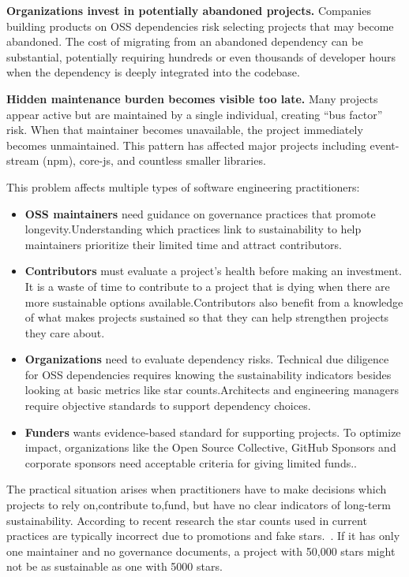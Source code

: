 \documentclass[conference]{IEEEtran}
\begin{document}
\textbf{Organizations invest in potentially abandoned projects.} Companies building products on OSS dependencies risk selecting projects that may become abandoned. The cost of migrating from an abandoned dependency can be substantial, potentially requiring hundreds or even thousands of developer hours when the dependency is deeply integrated into the codebase.

\textbf{Hidden maintenance burden becomes visible too late.} Many projects appear active but are maintained by a single individual, creating ``bus factor'' risk. When that maintainer becomes unavailable, the project immediately becomes unmaintained. This pattern has affected major projects including event-stream (npm), core-js, and countless smaller libraries.

This problem affects multiple types of software engineering practitioners:
\begin{itemize}
    \item \textbf{OSS maintainers} need guidance on governance practices that promote longevity.Understanding which practices link to sustainability to help maintainers prioritize their limited time and attract contributors.
    \item \textbf{Contributors} must evaluate a project's health before making an investment. It is a waste of time to contribute to a project that is dying when there are more sustainable options available.Contributors also benefit from a knowledge of what makes projects sustained so that they can help strengthen projects they care about.
    \item \textbf{Organizations} need to evaluate dependency risks. Technical due diligence for OSS dependencies requires knowing the sustainability indicators besides looking at basic metrics like star counts.Architects and engineering managers require objective standards to support dependency choices.
    \item \textbf{Funders} wants evidence-based standard for supporting projects. To optimize impact, organizations like the Open Source Collective, GitHub Sponsors and corporate sponsors need acceptable criteria for giving limited funds..
\end{itemize}

The practical situation arises when practitioners have to make decisions which projects to rely on,contribute to,fund,
but have no clear indicators of long-term sustainability. According to recent research the star counts used in current practices are typically incorrect due to promotions and fake stars.~\cite{he2024}. If it has only one maintainer and no governance documents, a project with 50,000 stars might not be as sustainable as one with 5000 stars.
\end{document}
